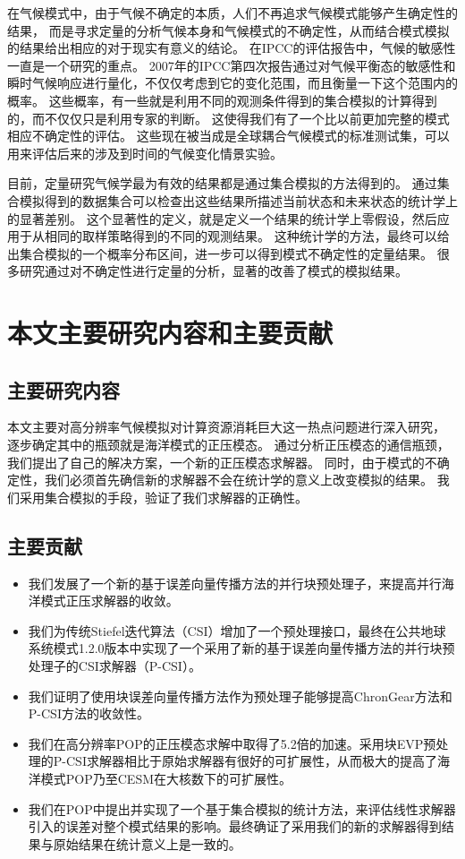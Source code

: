 在气候模式中，由于气候不确定的本质，人们不再追求气候模式能够产生确定性的结果，
而是寻求定量的分析气候本身和气候模式的不确定性，从而结合模式模拟的结果给出相应的对于现实有意义的结论。
在IPCC的评估报告中，气候的敏感性一直是一个研究的重点\cite{meehl2007global}。
2007年的IPCC第四次报告通过对气候平衡态的敏感性和瞬时气候响应进行量化，不仅仅考虑到它的变化范围，而且衡量一下这个范围内的概率。
这些概率，有一些就是利用不同的观测条件得到的集合模拟的计算得到的，而不仅仅只是利用专家的判断。 
这使得我们有了一个比以前更加完整的模式相应不确定性的评估。 
这些现在被当成是全球耦合气候模式的标准测试集，可以用来评估后来的涉及到时间的气候变化情景实验。 
 
目前，定量研究气候学最为有效的结果都是通过集合模拟的方法得到的\cite{von2013testing,reynolds1994random, allen2002towards}。
通过集合模拟得到的数据集合可以检查出这些结果所描述当前状态和未来状态的统计学上的显著差别。
这个显著性的定义，就是定义一个结果的统计学上零假设，然后应用于从相同的取样策略得到的不同的观测结果。 
这种统计学的方法，最终可以给出集合模拟的一个概率分布区间，进一步可以得到模式不确定性的定量结果。
很多研究通过对不确定性进行定量的分析，显著的改善了模式的模拟结果\cite{reynolds1994random}。


\section{本文主要研究内容和主要贡献}
\subsection{主要研究内容}
本文主要对高分辨率气候模拟对计算资源消耗巨大这一热点问题进行深入研究，
逐步确定其中的瓶颈就是海洋模式的正压模态。
通过分析正压模态的通信瓶颈，我们提出了自己的解决方案，一个新的正压模态求解器。 
同时，由于模式的不确定性，我们必须首先确信新的求解器不会在统计学的意义上改变模拟的结果。 
我们采用集合模拟的手段，验证了我们求解器的正确性。 

\subsection{主要贡献}
\begin{itemize}
\item  
我们发展了一个新的基于误差向量传播方法的并行块预处理子\cite{roache1995elliptic}，来提高并行海洋模式正压求解器的收敛。 
\item  
我们为传统Stiefel迭代算法（CSI）\cite{hu2013scalable}增加了一个预处理接口，最终在公共地球系统模式1.2.0版本中实现了一个采用了新的基于误差向量传播方法的并行块预处理子的CSI求解器（P-CSI）。
\item  
我们证明了使用块误差向量传播方法作为预处理子能够提高ChronGear方法和P-CSI方法的收敛性。 
\item  
我们在高分辨率POP的正压模态求解中取得了5.2倍的加速。采用块EVP预处理的P-CSI求解器相比于原始求解器有很好的可扩展性，从而极大的提高了海洋模式POP乃至CESM在大核数下的可扩展性。 
\item  
我们在POP中提出并实现了一个基于集合模拟的统计方法，来评估线性求解器引入的误差对整个模式结果的影响。最终确证了采用我们的新的求解器得到结果与原始结果在统计意义上是一致的。 
\end{itemize}
